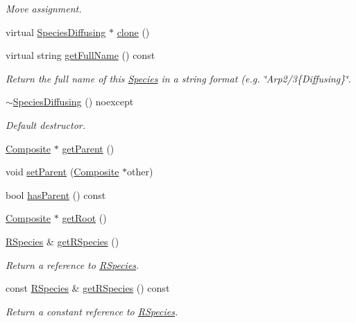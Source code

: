 \begin{DoxyCompactItemize}
\begin{DoxyCompactList}\small\item\em Move assignment. \end{DoxyCompactList}\item 
virtual \hyperlink{classSpeciesDiffusing}{Species\+Diffusing} $\ast$ \hyperlink{classSpeciesDiffusing_af3b8326e4b81d2bb4d65630ee7a49995}{clone} ()
\item 
virtual string \hyperlink{classSpeciesDiffusing_a143bb7cf1e7dfbd4d514224b4d0ba042}{get\+Full\+Name} () const 
\begin{DoxyCompactList}\small\item\em Return the full name of this \hyperlink{classSpecies}{Species} in a string format (e.\+g. \char`\"{}\+Arp2/3\{\+Diffusing\}\char`\"{}. \end{DoxyCompactList}\item 
\hyperlink{classSpeciesDiffusing_a41f1ef9dce4d47e470ffab1c8cf8d960}{$\sim$\+Species\+Diffusing} () noexcept
\begin{DoxyCompactList}\small\item\em Default destructor. \end{DoxyCompactList}\item 
\hyperlink{classComposite}{Composite} $\ast$ \hyperlink{classSpecies_af24cab7cbaa561d35b08fef5faf05fdf}{get\+Parent} ()
\item 
void \hyperlink{classSpecies_acc64c5b61abf911872d433ac32b62de8}{set\+Parent} (\hyperlink{classComposite}{Composite} $\ast$other)
\item 
bool \hyperlink{classSpecies_a40262d7217fcc28a31682aee40a19232}{has\+Parent} () const 
\item 
\hyperlink{classComposite}{Composite} $\ast$ \hyperlink{classSpecies_a876c8a827476a11e05f3b7a7669c29b6}{get\+Root} ()
\item 
\hyperlink{classRSpecies}{R\+Species} \& \hyperlink{classSpecies_a048dd7bc3fecd08b1b1797dc83aa163d}{get\+R\+Species} ()
\begin{DoxyCompactList}\small\item\em Return a reference to \hyperlink{classRSpecies}{R\+Species}. \end{DoxyCompactList}\item 
const \hyperlink{classRSpecies}{R\+Species} \& \hyperlink{classSpecies_aa1069a34b360f84d186f48bd99f80971}{get\+R\+Species} () const 
\begin{DoxyCompactList}\small\item\em Return a constant reference to \hyperlink{classRSpecies}{R\+Species}. \end{DoxyCompactList}\item 

\end{DoxyCompactItemize}
